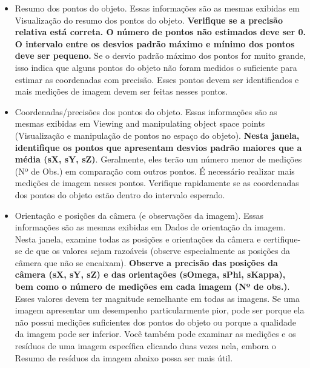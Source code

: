 \documentclass[
  12pt,
  letterpaper,
  DIV=11,
  numbers=noendperiod]{scrreprt}
\providecommand{\tightlist}{%
  \setlength{\itemsep}{0pt}\setlength{\parskip}{0pt}}
\begin{document}
\begin{itemize}
\tightlist
\item
  Resumo dos pontos do objeto. Essas informações são as mesmas exibidas
  em Visualização do resumo dos pontos do objeto. \textbf{Verifique se a
  precisão relativa está correta. O número de pontos não estimados deve
  ser 0. O intervalo entre os desvios padrão máximo e mínimo dos pontos
  deve ser pequeno.} Se o desvio padrão máximo dos pontos for muito
  grande, isso indica que alguns pontos do objeto não foram medidos o
  suficiente para estimar as coordenadas com precisão. Esses pontos
  devem ser identificados e mais medições de imagem devem ser feitas
  nesses pontos.
\end{itemize}

\begin{itemize}
\tightlist
\item
  Coordenadas/precisões dos pontos do objeto. Essas informações são as
  mesmas exibidas em Viewing and manipulating object space points
  (Visualização e manipulação de pontos no espaço do objeto).
  \textbf{Nesta janela, identifique os pontos que apresentam desvios
  padrão maiores que a média (sX, sY, sZ)}. Geralmente, eles terão um
  número menor de medições (Nº de Obs.) em comparação com outros pontos.
  É necessário realizar mais medições de imagem nesses pontos. Verifique
  rapidamente se as coordenadas dos pontos do objeto estão dentro do
  intervalo esperado.
\end{itemize}

\begin{itemize}
\tightlist
\item
  Orientação e posições da câmera (e observações da imagem). Essas
  informações são as mesmas exibidas em Dados de orientação da imagem.
  Nesta janela, examine todas as posições e orientações da câmera e
  certifique-se de que os valores sejam razoáveis
  \hspace{0pt}\hspace{0pt}(observe especialmente as posições da câmera
  que não se encaixam). \textbf{Observe a precisão das posições da
  câmera (sX, sY, sZ) e das orientações (sOmega, sPhi, sKappa), bem como
  o número de medições em cada imagem (Nº de obs.)}. Esses valores devem
  ter magnitude semelhante em todas as imagens. Se uma imagem apresentar
  um desempenho particularmente pior, pode ser porque ela não possui
  medições suficientes dos pontos do objeto ou porque a qualidade da
  imagem pode ser inferior. Você também pode examinar as medições e os
  resíduos de uma imagem específica clicando duas vezes nela, embora o
  Resumo de resíduos da imagem abaixo possa ser mais útil.
\end{itemize}
\end{document}
